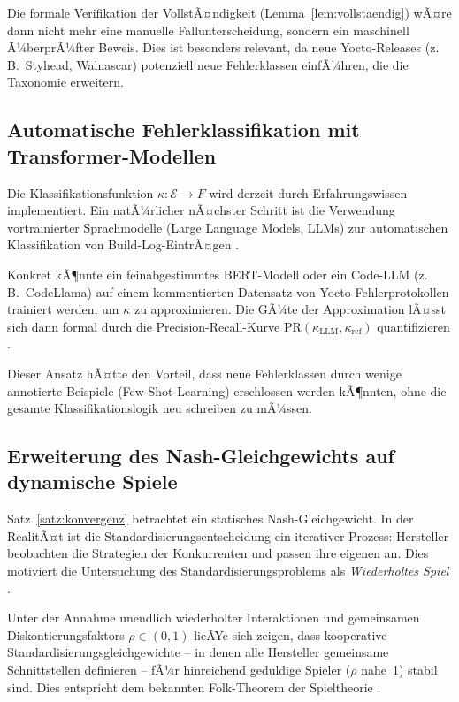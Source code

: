 ﻿\documentclass[a4paper,12pt]{article}
\theoremstyle{definition}
\begin{document}
Die formale Verifikation der VollstÃ¤ndigkeit (Lemma~\ref{lem:vollstaendig}) wÃ¤re dann
nicht mehr eine manuelle Fallunterscheidung, sondern ein maschinell Ã¼berprÃ¼fter Beweis.
Dies ist besonders relevant, da neue Yocto-Releases (z.\,B.\ Styhead, Walnascar)
potenziell neue Fehlerklassen einfÃ¼hren, die die Taxonomie erweitern.

\subsection{Automatische Fehlerklassifikation mit Transformer-Modellen}

Die Klassifikationsfunktion $\kappa: \mathcal{E} \to F$ wird derzeit durch
Erfahrungswissen implementiert. Ein natÃ¼rlicher nÃ¤chster Schritt ist die
Verwendung vortrainierter Sprachmodelle (Large Language Models, LLMs) zur
automatischen Klassifikation von Build-Log-EintrÃ¤gen \cite{devlin2019bert}.

Konkret kÃ¶nnte ein feinabgestimmtes BERT-Modell oder ein Code-LLM (z.\,B.\ CodeLlama)
auf einem kommentierten Datensatz von Yocto-Fehlerprotokollen trainiert werden,
um $\kappa$ zu approximieren. Die GÃ¼te der Approximation lÃ¤sst sich dann formal
durch die Precision-Recall-Kurve $\mathrm{PR}(\kappa_{\mathrm{LLM}}, \kappa_{\mathrm{ref}})$
quantifizieren \cite{manning2008}.

Dieser Ansatz hÃ¤tte den Vorteil, dass neue Fehlerklassen durch wenige annotierte
Beispiele (Few-Shot-Learning) erschlossen werden kÃ¶nnten, ohne die gesamte
Klassifikationslogik neu schreiben zu mÃ¼ssen.

\subsection{Erweiterung des Nash-Gleichgewichts auf dynamische Spiele}

Satz~\ref{satz:konvergenz} betrachtet ein statisches Nash-Gleichgewicht.
In der RealitÃ¤t ist die Standardisierungsentscheidung ein iterativer Prozess:
Hersteller beobachten die Strategien der Konkurrenten und passen ihre eigenen an.
Dies motiviert die Untersuchung des Standardisierungsproblems als
\emph{Wiederholtes Spiel} \cite{fudenberg1991}.

Unter der Annahme unendlich wiederholter Interaktionen und gemeinsamen Diskontierungsfaktors
$\rho \in (0,1)$ lieÃŸe sich zeigen, dass kooperative Standardisierungsgleichgewichte
-- in denen alle Hersteller gemeinsame Schnittstellen definieren -- fÃ¼r hinreichend
geduldige Spieler ($\rho$ nahe~1) stabil sind. Dies entspricht dem bekannten
Folk-Theorem der Spieltheorie \cite{aumann1994}.
\end{document}

